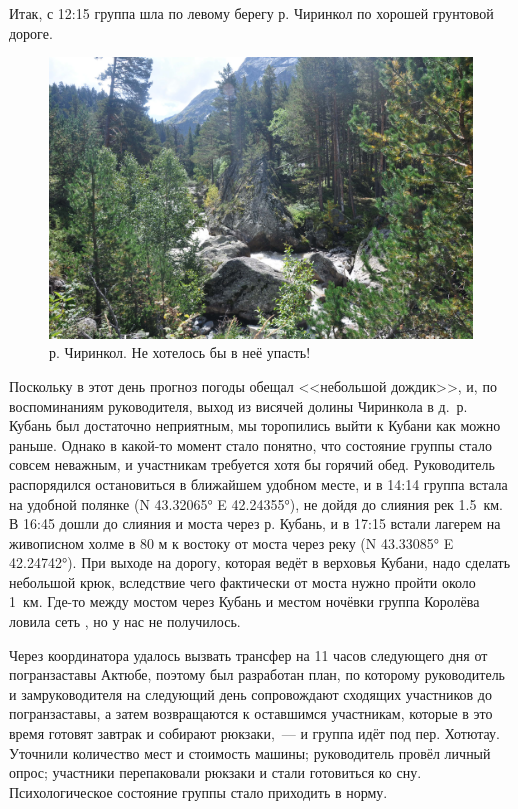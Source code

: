 Итак, с 12:15 группа шла по левому берегу р. Чиринкол по хорошей грунтовой дороге.
 
\begin{figure}[h!]
	\centering
	\includegraphics[width=0.7\linewidth]{../pics/DSC_0461 2}
	\caption{р. Чиринкол. Не хотелось бы в неё упасть!}
	\label{fig:DSC_0461}
\end{figure}

Поскольку в этот день прогноз погоды обещал <<небольшой дождик>>\texttrademark, и, по воспоминаниям руководителя, выход из висячей долины Чиринкола в д.~р. Кубань был достаточно неприятным, мы торопились выйти к Кубани как можно раньше. Однако в какой-то момент стало понятно, что состояние группы стало совсем неважным, и участникам требуется хотя бы горячий обед. Руководитель распорядился остановиться в ближайшем удобном месте, и в 14:14 группа встала на удобной полянке (N 43.32065° E 42.24355°), не дойдя до слияния рек 1.5~км. В 16:45 дошли до слияния и моста через р. Кубань, и в 17:15 встали лагерем на живописном холме в 80 м к востоку от моста через реку (N 43.33085° E 42.24742°). При выходе на дорогу, которая ведёт в верховья Кубани, надо сделать небольшой крюк, вследствие чего фактически от моста нужно пройти около 1~км.  Где-то между мостом через Кубань и местом ночёвки группа Королёва ловила сеть \cite{Korolyov2018}, но у нас не получилось. 

Через координатора удалось вызвать трансфер на 11 часов следующего дня от погранзаставы Актюбе, поэтому был разработан план, по которому руководитель и замруководителя на следующий день сопровождают сходящих участников до погранзаставы, а затем возвращаются к оставшимся участникам, которые в это время готовят завтрак и собирают рюкзаки,~--- и группа идёт под пер. Хотютау. Уточнили количество мест и стоимость машины; руководитель провёл личный опрос; участники перепаковали рюкзаки и стали готовиться ко сну. Психологическое состояние группы стало приходить в норму.

\clearpage